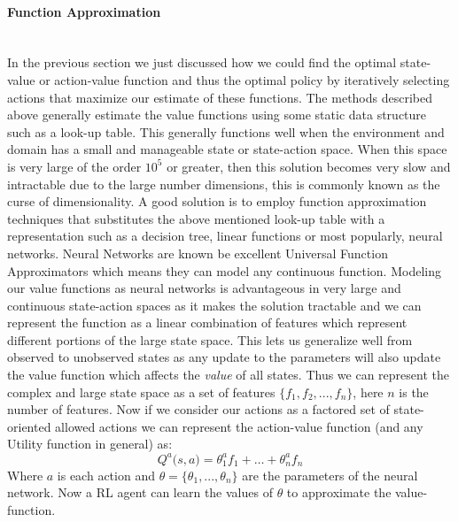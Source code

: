 \documentclass[14pt]{extarticle}
\newcommand{\myparagraph}[1]{\paragraph{#1}\mbox{}\\ \linebreak}
\numberwithin{equation}{section}
\begin{document}
		\myparagraph{Function Approximation} \label{fn_aprrox}
		In the previous section we just discussed how we could find the optimal state-value or action-value function and thus the optimal policy by iteratively selecting actions that maximize our estimate of these functions.  The methods described above generally estimate the value functions using some static data structure such as a look-up table. This generally functions well when the environment and domain has a small and manageable state or state-action space.  When this space is very large of the order $10^5$ or greater, then this solution becomes very slow and intractable due to the large number dimensions, this is commonly known as the curse of dimensionality\cite{verleysen2005curse}. A good solution is to employ function approximation techniques that substitutes the above mentioned look-up table with a representation such as a decision tree, linear functions or most popularly, neural networks. Neural Networks are known be excellent Universal Function Approximators \cite{hornik1989multilayer} which means they can model any continuous function. Modeling our value functions as neural networks is advantageous in very large and continuous state-action spaces as it makes the solution tractable and we can represent the function as a linear combination of features which represent different portions of the large state space. This lets us generalize well from observed to unobserved states as any update to the parameters will also update the value function which affects the \textit{value} of all states. Thus we can represent the complex and large state space as a set of features $\{f_1,f_2,...,f_n\}$, here $n$ is the number of features. Now if we consider our actions as a factored set of state-oriented allowed actions we can represent the action-value function (and any Utility function in general) as: 
		\begin{equation}
		Q^a\big(s,a\big) = {\theta_1^a}f_1+\dots+{\theta_n^a}f_n
		\end{equation}		
		Where $a$ is each action and $\theta = \{\theta_1,...,\theta_n\}$ are the parameters of the neural network. Now a RL agent can learn the values of $\theta$ to approximate the value-function. 
		
\end{document}
